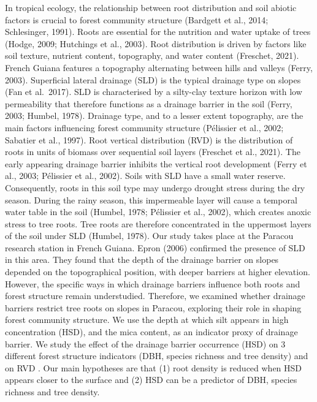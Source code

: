 \documentclass[fleqn,10pt]{latex/stylish_article} %
\begin{document}
In tropical ecology, the relationship between root distribution and soil abiotic factors is crucial to forest community structure (Bardgett et al., 2014; Schlesinger, 1991). Roots are essential for the nutrition and water uptake of trees (Hodge, 2009; Hutchings et al., 2003). Root distribution is driven by factors like soil texture, nutrient content, topography, and water content (Freschet, 2021).
French Guiana features a topography alternating between hills and valleys (Ferry, 2003). Superficial lateral drainage (SLD) is the typical drainage type on slopes (Fan et al.~2017). SLD is characterised by a silty-clay texture horizon with low permeability that therefore functions as a drainage barrier in the soil (Ferry, 2003; Humbel, 1978). Drainage type, and to a lesser extent topography, are the main factors influencing forest community structure (Pélissier et al., 2002; Sabatier et al., 1997).
Root vertical distribution (RVD) is the distribution of roots in units of biomass over sequential soil layers (Freschet et al., 2021). The early appearing drainage barrier inhibits the vertical root development (Ferry et al., 2003; Pélissier et al., 2002). Soils with SLD have a small water reserve. Consequently, roots in this soil type may undergo drought stress during the dry season. During the rainy season, this impermeable layer will cause a temporal water table in the soil (Humbel, 1978; Pélissier et al., 2002), which creates anoxic stress to tree roots. Tree roots are therefore concentrated in the uppermost layers of the soil under SLD (Humbel, 1978).
Our study takes place at the Paracou research station in French Guiana. Epron (2006) confirmed the presence of SLD in this area. They found that the depth of the drainage barrier on slopes depended on the topographical position, with deeper barriers at higher elevation. However, the specific ways in which drainage barriers influence both roots and forest structure remain understudied. Therefore, we examined whether drainage barriers restrict tree roots on slopes in Paracou, exploring their role in shaping forest community structure. We use the depth at which silt appears in high concentration (HSD), and the mica content, as an indicator proxy of drainage barrier. We study the effect of the drainage barrier occurrence (HSD) on 3 different forest structure indicators (DBH, species richness and tree density) and on RVD . Our main hypotheses are that (1) root density is reduced when HSD appears closer to the surface and (2) HSD can be a predictor of DBH, species richness and tree density.
\end{document}
